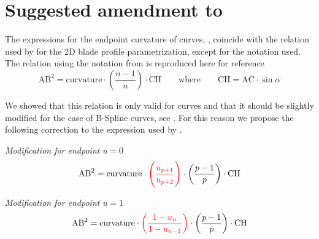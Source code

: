 

\section{Suggested amendment to \textcite{Mykhaskiv2018}}

The expressions for the endpoint curvature of \Bezier curves, , coincide with the relation used by \textcite{Mykhaskiv2018} for the 2D blade profile parametrization, except for the notation used. The relation using the notation from \textcite{Mykhaskiv2018} is reproduced here for reference
\begin{equation*}
    \mathrm{AB}^2 = \mathrm{curvature} \cdot \left(\frac{n-1}{n}\right) \cdot \mathrm{CH} \qquad \text{where} \qquad \mathrm{CH} = \mathrm{AC} \cdot \sin{\alpha}
\end{equation*}

We showed that this relation is only valid for \Bezier curves and that it should be slightly modified for the case of B-Spline curves, see . For this reason we propose the following correction to the expression used by \textcite{Mykhaskiv2018}.

\textit{Modification for endpoint $u=0$}
\begin{equation*}
    \mathrm{AB}^2 = \mathrm{curvature} \cdot \textcolor{red}{\left( \frac{u_{p+1}}{u_{p+2}}  \right)} \cdot \left(\frac{p-1}{p}\right) \cdot \mathrm{CH}
\end{equation*}

\textit{Modification for endpoint $u=1$}
\begin{equation*}
    \mathrm{AB}^2 = \mathrm{curvature} \cdot  \textcolor{red}{\left( \frac{1-u_{n}}{1-u_{n-1}}  \right)} \cdot \left(\frac{p-1}{p}\right) \cdot \mathrm{CH}
\end{equation*}

